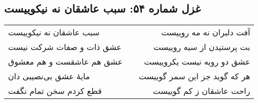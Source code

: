 \begin{center}
\section*{غزل شماره ۵۴: سبب عاشقان نه نیکوییست}
\label{sec:054}
\begin{longtable}{l p{0.5cm} r}
سبب عاشقان نه نیکوییست
&&
آفت دلبران نه مه روییست
\\
عشق ذات و صفات شرکت نیست
&&
بت پرستیدن از سیه روییست
\\
عشق هم عاشقست و هم معشوق
&&
عشق دو رویه نیست یکروییست
\\
مایهٔ عشق بی‌نصیبی دان
&&
هر که گوید جز این سمر گوییست
\\
قطع کردم سخن تمام نگفت
&&
راحت عاشقان ز کم گوییست
\\
\end{longtable}
\end{center}
